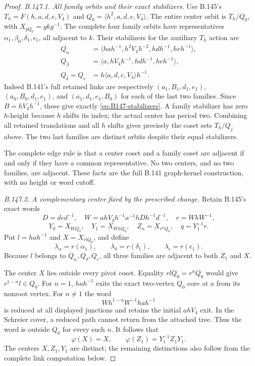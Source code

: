 \begin{proof}
\emph{B.147.1. All family orbits and their exact stabilizers.}
Use B.145's $T_h=F(h,a,d,e,V_4)$ and
$Q_0=\langle h^2,a,d,e,V_4\rangle$. The entire center orbit is
$T_h/Q_0$, with $X_{gQ_0}=gkg^{-1}$. The complete four family
orbits have representatives
$\alpha_1,\beta_0,\delta_1,\epsilon_1$, all adjacent to $k$.
Their stabilizers for the auxiliary $T_h$ action are
\begin{equation}\label{eq:B147-stabilizers}
\begin{aligned}
 Q_\alpha&=\langle hah^{-1},h^2V_4h^{-2},hdh^{-1},heh^{-1}\rangle,\\
 Q_\beta&=\langle a,hV_4h^{-1},hdh^{-1},heh^{-1}\rangle,\\
 Q_\delta=Q_\epsilon&=h\langle a,d,e,V_4\rangle h^{-1}.
\end{aligned}
\end{equation}
Indeed B.141's full retained links are respectively
$(a_1,B_1,d_1,e_1)$, $(a_0,B_0,d_1,e_1)$, and
$(a_1,d_1,e_1,B_0)$ for each of the last two families.
Since $B=hV_4h^{-1}$, these give exactly
\eqref{eq:B147-stabilizers}. A family stabilizer has zero
$h$-height because $h$ shifts its index; the actual center has
period two. Combining all retained translations and all $h$
shifts gives precisely the coset sets $T_h/Q_j$ above. The two
last families are distinct orbits despite their equal stabilizers.

The complete edge rule is that a center coset and a family coset
are adjacent if and only if they have a common representative.
No two centers, and no two families, are adjacent. These facts
are the full B.141 graph-kernel construction, with no height or
word cutoff.

\emph{B.147.2. A complementary center fixed by the prescribed change.}
Retain B.145's exact words
\[
 D=ded^{-1},\quad
 W=ahV_4h^{-1}a^{-1}hDh^{-1}d^{-1},\quad r=WhW^{-1},
\]
\[
 Y_0=X_{WQ_0},\quad Y_1=X_{WhQ_0},\quad
 Z_n=X_{r^nQ_0},\quad q=Y_1^{-1}r.
\]
Put $l=hah^{-1}$ and $X=X_{rlQ_0}$, and define
\[
 \lambda_\alpha=r(\alpha_1),\qquad
 \lambda_\delta=r(\delta_1),\qquad
 \lambda_\epsilon=r(\epsilon_1).
\]
Because $l$ belongs to $Q_\alpha,Q_\delta,Q_\epsilon$, all
three families are adjacent to both $Z_1$ and $X$.

The center $X$ lies outside every pivot coset. Equality
$rlQ_0=r^nQ_0$ would give $r^{1-n}l\in Q_0$. For $n=1$,
$hah^{-1}$ exits the exact two-vertex $Q_0$ core at $a$ from
its nonroot vertex. For $n\ne1$ the word
\[
 Wh^{1-n}W^{-1}hah^{-1}
\]
is reduced at all displayed junctions and retains the initial
$ahV_4$ exit. In the Schreier cover, a reduced path cannot return
from the attached tree. Thus the word is outside $Q_0$ for every
such $n$. It follows that
\begin{equation}\label{eq:B147-center-values}
 \varphi(X)=X,\qquad
 \varphi(Z_1)=Y_1^{-1}Z_1Y_1.
\end{equation}
The centers $X,Z_1,Y_1$ are distinct; the remaining distinctions
also follow from the complete link computation below.


\end{proof}
